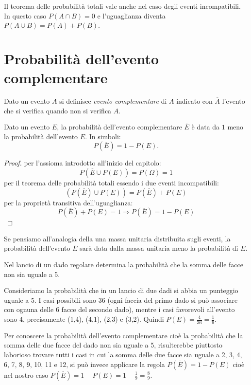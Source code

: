 \osservazione Il teorema delle probabilità totali vale anche nel caso degli 
eventi incompatibili. In questo caso \(P(A\cap B)=0\) e l'uguaglianza diventa 
\(P(A\cup B)=P(A)+P(B)\).


\section{Probabilità dell'evento complementare}
\label{sec:09_complementare}

Dato un evento \(A\) si definisce \emph{evento complementare} di \(A\) indicato 
con 
\(\overline A\) l'evento che si verifica quando non si verifica \(A\).
\begin{teorema}
Dato un evento \(E\), la probabilità dell'evento complementare \(\overline E\) 
è 
data da \(1\) meno la probabilità dell'evento \(E\). In simboli: 
\[ P(\overline E)=1-P(E). \]
\end{teorema}
\begin{proof} per l'assioma introdotto all'inizio del capitolo: 
\[P(\overline E\cup P(E))=P(\Omega )=1\]
per il teorema delle probabilità totali essendo i due eventi incompatibili: 
\[(P(\overline E)\cup P(E))=P(\overline E)+P(E)\]
per la proprietà transitiva dell'uguaglianza: 
\[P(\overline E)+P(E)=1 \Rightarrow P(\overline E)=1-P(E)\]
\end{proof}
Se pensiamo all'analogia della una massa unitaria distribuita sugli eventi, 
la probabilità dell'evento \(\overline E\) sarà data dalla massa unitaria 
meno la probabilità di \(E\).

\begin{esempio}
Nel lancio di un dado regolare determina la probabilità che la somma delle 
facce 
non sia uguale a 5.

Consideriamo la probabilità che in un lancio di due dadi si abbia un 
punteggio 
uguale a 5. I casi possibili sono 36 (ogni faccia del primo dado si può 
associare con ognuna delle 6 facce del secondo dado), mentre i casi 
favorevoli 
all'evento sono 4, precisamente (1,4), (4,1), (2,3) e (3,2). 
Quindi \(P(E)=\frac{4}{36}=\frac{1}{9}\).

Per conoscere la probabilità dell'evento complementare cioè la probabilità 
che la somma delle due facce del dado non sia uguale a 5, risulterebbe 
piuttosto laborioso trovare tutti i casi in cui la somma delle due facce sia 
uguale a 2, 3, 4, 6, 7, 8, 9, 10, 11 e 12, si può invece applicare la 
regola 
\(P(\overline E)=1-P(E)\) 
cioè nel nostro caso \(P(\overline E)=1-P(E)=1-\frac{1}{9}=\frac{8}{9}\).
\end{esempio}

